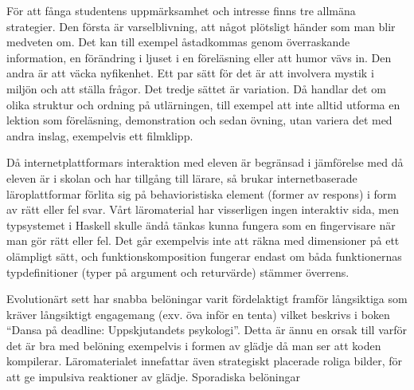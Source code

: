 \begin{draft}
För att fånga studentens uppmärksamhet och intresse finns tre allmäna
strategier. Den första är varselblivning, att något plötsligt händer som man
blir medveten om. Det kan till exempel åstadkommas genom överraskande
information, en förändring i ljuset i en föreläsning eller att humor vävs in.
Den andra är att väcka nyfikenhet. Ett par sätt för det är att involvera mystik
i miljön och att ställa frågor. Det tredje sättet är variation. Då handlar det
om olika struktur och ordning på utlärningen, till exempel att inte alltid
utforma en lektion som föreläsning, demonstration och sedan övning, utan variera
det med andra inslag, exempelvis ett filmklipp.


Då internetplattformars interaktion med eleven är begränsad i jämförelse med då
eleven är i skolan och har tillgång till lärare, så brukar internetbaserade
läroplattformar förlita sig på behavioristiska element (former av respons) i form av rätt eller fel
svar\cite{LSB_und}. Vårt läromaterial har visserligen ingen interaktiv sida,
men typsystemet i Haskell skulle ändå tänkas kunna fungera som en fingervisare
när man gör rätt eller fel. Det går exempelvis inte att räkna med dimensioner
på ett olämpligt sätt, och funktionskomposition fungerar endast om båda funktionernas
typdefinitioner (typer på argument och returvärde) stämmer överrens. 

Evolutionärt sett har snabba belöningar varit fördelaktigt framför långsiktiga
som kräver långsiktigt engagemang (exv. öva inför en tenta) vilket beskrivs i
boken ``Dansa på deadline: Uppskjutandets psykologi''\cite{DPD}. Detta är ännu en
orsak till varför det är bra med belöning exempelvis i formen av glädje då man
ser att koden kompilerar. Läromaterialet innefattar även strategiskt placerade
roliga bilder, för att ge impulsiva reaktioner av glädje. Sporadiska belöningar

\end{draft}
